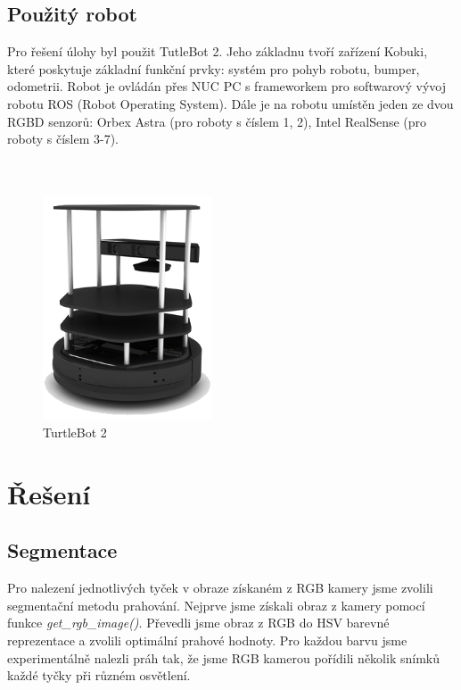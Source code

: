 \documentclass{article}
\begin{document}
\newpage

\subsection{Použitý robot}

	Pro řešení úlohy byl použit TutleBot 2. Jeho základnu tvoří zařízení Kobuki, které poskytuje základní funkční prvky: systém pro pohyb robotu, bumper, odometrii. Robot je ovládán přes NUC PC s frameworkem pro softwarový vývoj robotu ROS (Robot Operating System). Dále je na robotu umístěn jeden ze dvou RGBD senzorů: Orbex Astra (pro roboty s číslem 1, 2), Intel RealSense (pro roboty s číslem 3-7). %
	\\
	\\
	\\
	
\begin{figure}[h]
	\centering
	\includegraphics[width=5cm]{turtlebot_2.png}
	\caption{TurtleBot 2}
\end{figure}
	

\clearpage


\section{Řešení}

\subsection{Segmentace}
	
	Pro nalezení jednotlivých tyček v obraze získaném z RGB kamery jsme zvolili segmentační metodu prahování. Nejprve jsme získali obraz z kamery pomocí funkce {\it get\_rgb\_image()}. Převedli jsme obraz z RGB do HSV barevné reprezentace a zvolili optimální prahové hodnoty. Pro každou barvu jsme experimentálně nalezli práh tak, že jsme RGB kamerou pořídili několik snímků každé tyčky při různém osvětlení. 
\end{document}
